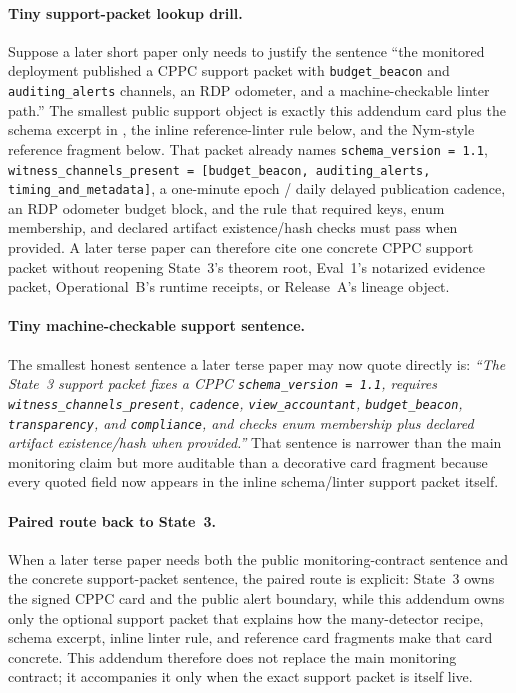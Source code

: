 \documentclass[11pt]{article}
\theoremstyle{definition}
\theoremstyle{remark}
\begin{document}
\paragraph{Tiny support-packet lookup drill.}
Suppose a later short paper only needs to justify the sentence ``the monitored deployment published a CPPC support packet with \texttt{budget\_beacon} and \texttt{auditing\_alerts} channels, an RDP odometer, and a machine-checkable linter path.''
The smallest public support object is exactly this addendum card plus the schema excerpt in , the inline reference-linter rule below, and the Nym-style reference fragment below.
That packet already names \texttt{schema\_version = 1.1}, \texttt{witness\_channels\_present = [budget\_beacon, auditing\_alerts, timing\_and\_metadata]}, a one-minute epoch / daily delayed publication cadence, an RDP odometer budget block, and the rule that required keys, enum membership, and declared artifact existence/hash checks must pass when provided.
A later terse paper can therefore cite one concrete CPPC support packet without reopening State~3's theorem root, Eval~1's notarized evidence packet, Operational~B's runtime receipts, or Release~A's lineage object.

\paragraph{Tiny machine-checkable support sentence.}
The smallest honest sentence a later terse paper may now quote directly is: \emph{``The State~3 support packet fixes a CPPC \texttt{schema\_version = 1.1}, requires \texttt{witness\_channels\_present}, \texttt{cadence}, \texttt{view\_accountant}, \texttt{budget\_beacon}, \texttt{transparency}, and \texttt{compliance}, and checks enum membership plus declared artifact existence/hash when provided.''}
That sentence is narrower than the main monitoring claim but more auditable than a decorative card fragment because every quoted field now appears in the inline schema/linter support packet itself.

\paragraph{Paired route back to State~3.}
When a later terse paper needs both the public monitoring-contract sentence and the concrete support-packet sentence, the paired route is explicit: State~3 owns the signed CPPC card and the public alert boundary, while this addendum owns only the optional support packet that explains how the many-detector recipe, schema excerpt, inline linter rule, and reference card fragments make that card concrete.  This addendum therefore does not replace the main monitoring contract; it accompanies it only when the exact support packet is itself live.\cite{series:state3}
\end{document}
